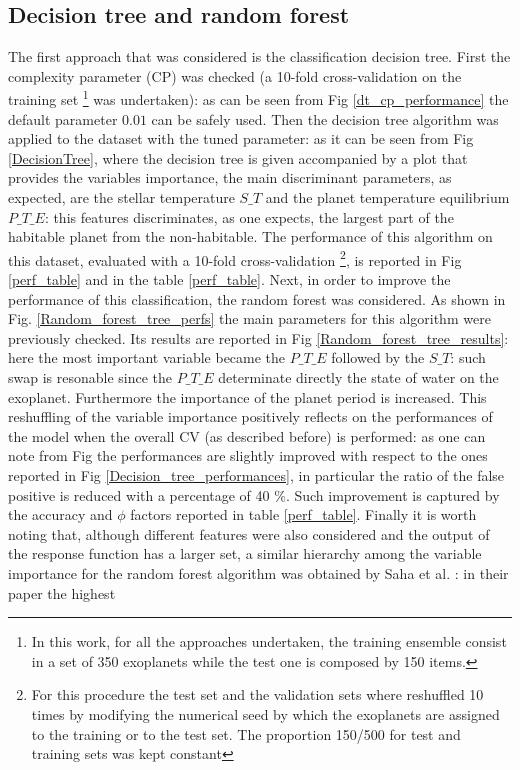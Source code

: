 \documentclass[
12pt, %
a4paper, %
oneside, %
headinclude,footinclude, %
BCOR5mm, %
]{scrartcl}
\begin{document}
\clearpage

\subsection{Decision tree and random forest}
The first approach that was considered is the classification decision tree. First the complexity parameter (CP) was checked (a 10-fold cross-validation on the training set \footnote{In this work, for all the approaches undertaken, the training ensemble consist in a set of 350 exoplanets while the test one is composed by 150 items. } was undertaken): as can be seen from Fig \ref{dt_cp_performance} the default parameter $0.01$ can be safely used. Then the decision tree algorithm was applied to the dataset with the tuned parameter: as it can be seen from Fig \ref{DecisionTree}, where the decision tree is given accompanied by a plot that provides the variables importance,  the main discriminant parameters, as expected, are the stellar temperature $S\_T$ and the planet temperature equilibrium $P\_T\_E$: this features discriminates, as one expects, the largest part of the habitable planet from the non-habitable. The performance of this algorithm on this dataset, evaluated with a 10-fold cross-validation \footnote{For this procedure the test set and the validation sets where reshuffled 10 times by modifying the numerical seed by which the exoplanets are assigned to the training or to the test set. The proportion 150/500 for test and training sets was kept constant}, is reported in Fig \ref{perf_table} and in the table \ref{perf_table}. Next, in order to improve the performance of this classification, the random forest was considered. As shown in Fig. \ref{Random_forest_tree_perfs} the main parameters for this algorithm were previously checked. Its results are reported in Fig \ref{Random_forest_tree_results}: here the most important variable became the $P\_T\_E$ followed by the $S\_T$: such swap is resonable since the $P\_T\_E$ determinate directly the state of water on the exoplanet. Furthermore the importance of the planet period is increased.  This reshuffling of the variable importance positively reflects on the performances of the model when the overall CV (as described before) is performed: as one can note from Fig the performances are slightly improved with respect to the ones reported in Fig \ref{Decision_tree_performances}, in particular the ratio of the false positive is reduced with a percentage of 40 $\%$. Such improvement is captured by the accuracy and $\phi$ factors reported in table \ref{perf_table}. Finally it is worth noting that, although  different features were also considered and the output of the response function has a larger set,  a similar hierarchy  among the variable importance for the random forest algorithm was obtained by Saha et al. \cite{saha2018machine}: in their paper the highest 
\end{document}
